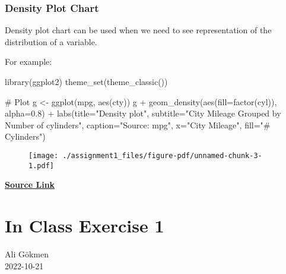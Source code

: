 \documentclass[
  letterpaper,
  DIV=11,
  numbers=noendperiod]{scrreprt}
\newenvironment{Shaded}{\begin{snugshade}}{\end{snugshade}}
\newcommand{\AttributeTok}[1]{\textcolor[rgb]{0.40,0.45,0.13}{#1}}
\newcommand{\CommentTok}[1]{\textcolor[rgb]{0.37,0.37,0.37}{#1}}
\newcommand{\FloatTok}[1]{\textcolor[rgb]{0.68,0.00,0.00}{#1}}
\newcommand{\FunctionTok}[1]{\textcolor[rgb]{0.28,0.35,0.67}{#1}}
\newcommand{\NormalTok}[1]{\textcolor[rgb]{0.00,0.23,0.31}{#1}}
\newcommand{\OtherTok}[1]{\textcolor[rgb]{0.00,0.23,0.31}{#1}}
\newcommand{\SpecialCharTok}[1]{\textcolor[rgb]{0.37,0.37,0.37}{#1}}
\newcommand{\StringTok}[1]{\textcolor[rgb]{0.13,0.47,0.30}{#1}}
\begin{document}
\hypertarget{density-plot-chart}{%
\subsection{Density Plot Chart}\label{density-plot-chart}}

Density plot chart can be used when we need to see representation of the
distribution of a variable.

For example:

\begin{Shaded}
\begin{Highlighting}[]
\FunctionTok{library}\NormalTok{(ggplot2)}
\FunctionTok{theme\_set}\NormalTok{(}\FunctionTok{theme\_classic}\NormalTok{())}

\CommentTok{\# Plot}
\NormalTok{g }\OtherTok{\textless{}{-}} \FunctionTok{ggplot}\NormalTok{(mpg, }\FunctionTok{aes}\NormalTok{(cty))}
\NormalTok{g }\SpecialCharTok{+} \FunctionTok{geom\_density}\NormalTok{(}\FunctionTok{aes}\NormalTok{(}\AttributeTok{fill=}\FunctionTok{factor}\NormalTok{(cyl)), }\AttributeTok{alpha=}\FloatTok{0.8}\NormalTok{) }\SpecialCharTok{+} 
    \FunctionTok{labs}\NormalTok{(}\AttributeTok{title=}\StringTok{"Density plot"}\NormalTok{, }
         \AttributeTok{subtitle=}\StringTok{"City Mileage Grouped by Number of cylinders"}\NormalTok{,}
         \AttributeTok{caption=}\StringTok{"Source: mpg"}\NormalTok{,}
         \AttributeTok{x=}\StringTok{"City Mileage"}\NormalTok{,}
         \AttributeTok{fill=}\StringTok{"\# Cylinders"}\NormalTok{)}
\end{Highlighting}
\end{Shaded}

\begin{figure}[H]

{\centering \texttt{[image: ./assignment1\_files/figure-pdf/unnamed-chunk-3-1.pdf]}

}

\end{figure}

\href{https://www.geeksforgeeks.org/}{\textbf{Source Link}}


\hypertarget{in-class-exercise-1}{%
\chapter{In Class Exercise 1}\label{in-class-exercise-1}}

Ali Gökmen\\
2022-10-21
\end{document}
